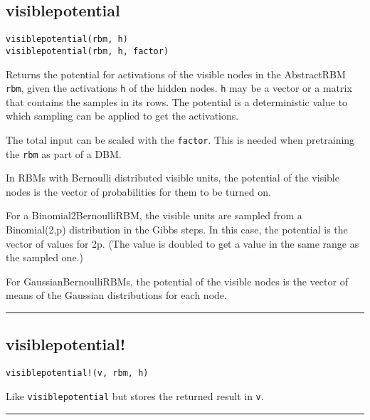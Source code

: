 \subsection*{visiblepotential}
\begin{verbatim}
visiblepotential(rbm, h)
visiblepotential(rbm, h, factor)
\end{verbatim}
Returns the potential for activations of the visible nodes in the AbstractRBM \texttt{rbm}, given the activations \texttt{h} of the hidden nodes. \texttt{h} may be a vector or a matrix that contains the samples in its rows. The potential is a deterministic value to which sampling can be applied to get the activations.

The total input can be scaled with the \texttt{factor}. This is needed when pretraining the \texttt{rbm} as part of a DBM.

In RBMs with Bernoulli distributed visible units, the potential of the visible nodes is the vector of probabilities for them to be turned on.

For a Binomial2BernoulliRBM, the visible units are sampled from a Binomial(2,p) distribution in the Gibbs steps. In this case, the potential is the vector of values for 2p. (The value is doubled to get a value in the same range as the sampled one.)

For GaussianBernoulliRBMs, the potential of the visible nodes is the vector of means of the Gaussian distributions for each node.

\noindent\rule{\textwidth}{1pt}
\subsection*{visiblepotential!}
\begin{verbatim}
visiblepotential!(v, rbm, h)
\end{verbatim}
Like \texttt{visiblepotential} but stores the returned result in \texttt{v}.

\noindent\rule{\textwidth}{1pt}
